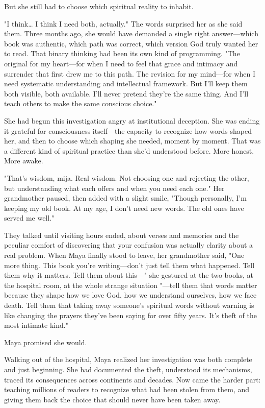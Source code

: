 \documentclass[12pt,twoside]{book}
\begin{document}
But she still had to choose which spiritual reality to inhabit.

"I think\ldots{} I think I need both, actually." The words surprised her as she said them. Three months ago, she would have demanded a single right answer—which book was authentic, which path was correct, which version God truly wanted her to read. That binary thinking had been its own kind of programming. "The original for my heart—for when I need to feel that grace and intimacy and surrender that first drew me to this path. The revision for my mind—for when I need systematic understanding and intellectual framework. But I'll keep them both visible, both available. I'll never pretend they're the same thing. And I'll teach others to make the same conscious choice."

She had begun this investigation angry at institutional deception. She was ending it grateful for consciousness itself—the capacity to recognize how words shaped her, and then to choose which shaping she needed, moment by moment. That was a different kind of spiritual practice than she'd understood before. More honest. More awake.

"That's wisdom, mija. Real wisdom. Not choosing one and rejecting the other, but understanding what each offers and when you need each one." Her grandmother paused, then added with a slight smile, "Though personally, I'm keeping my old book. At my age, I don't need new words. The old ones have served me well."

They talked until visiting hours ended, about verses and memories and the peculiar comfort of discovering that your confusion was actually clarity about a real problem. When Maya finally stood to leave, her grandmother said, "One more thing. This book you're writing—don't just tell them what happened. Tell them why it matters. Tell them about this—" she gestured at the two books, at the hospital room, at the whole strange situation "—tell them that words matter because they shape how we love God, how we understand ourselves, how we face death. Tell them that taking away someone's spiritual words without warning is like changing the prayers they've been saying for over fifty years. It's theft of the most intimate kind."

Maya promised she would.

Walking out of the hospital, Maya realized her investigation was both complete and just beginning. She had documented the theft, understood its mechanisms, traced its consequences across continents and decades. Now came the harder part: teaching millions of readers to recognize what had been stolen from them, and giving them back the choice that should never have been taken away.
\end{document}
